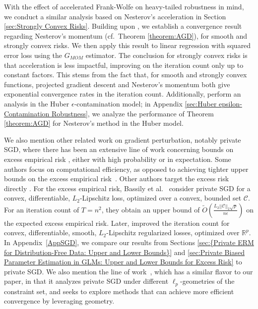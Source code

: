 \documentclass{article}
\begin{document}
With the effect of accelerated Frank-Wolfe on heavy-tailed robustness in mind, we conduct a similar analysis based on Nesterov's acceleration in Section \ref{sec:Strongly Convex Risks}. Building upon \cite{RE}, we establish a convergence result regarding Nesterov's momentum (cf.\ Theorem \ref{theorem:AGD}), for smooth and strongly convex risks. We then apply this result to linear regression with squared error loss using the $G_{MOM}$ estimator. The conclusion for strongly convex risks is that acceleration is less impactful, improving on the iteration count only up to constant factors. This stems from the fact that, for smooth and strongly convex functions, projected gradient descent and Nesterov's momentum both give exponential convergence rates in the iteration count. Additionally, \cite{RE} perform an analysis in the Huber $\epsilon$-contamination model; in Appendix \ref{sec:Huber epsilon-Contamination Robustness}, we analyze the performance of Theorem \ref{theorem:AGD} for Nesterov's method in the Huber model. 

We also mention other related work on gradient perturbation, notably private SGD, where there has been an extensive line of work concerning bounds on excess empirical risk \cite{SGD_DP_2013_Upd, Bassily_SGD_l2, Is_Inter_Nec_DP_ERM, DP_ERM_Faster, Priv_SGD_l1_Geom}, either with high probability or in expectation. Some authors focus on computational efficiency, as opposed to achieving tighter upper bounds on the excess empirical risk~\cite{Towards_Prac_DP_ERM, BOLT_ON_PRIV}. Other authors target the excess risk directly \cite{BasEtal19, SCO_Feldman_2020, BasEtal21}. For the excess empirical risk, Bassily et al.~\cite{Bassily_SGD_l2} consider private SGD for a convex, differentiable, $L_2$-Lipschitz loss, optimized over a convex, bounded set $\mathcal{C}$. For an iteration count of $T = n^2$, they obtain an upper bound of $\widetilde{O}\left(\frac{L_2||\mathcal{C}||_2\sqrt{p}}{n\epsilon}\right)$ on the expected excess empirical risk. Later, \cite{DP_ERM_Faster} improved the iteration count for convex, differentiable, smooth, $L_2$-Lipschitz regularized losses, optimized over $\mathbb{R}^p$. In Appendix~\ref{AppSGD}, we compare our results from Sections \ref{sec:{Private ERM for Distribution-Free Data: Upper and Lower Bounds}} and \ref{sec:Private Biased Parameter Estimation in GLMs: Upper and Lower Bounds for Excess Risk} to private SGD. We also mention the line of work~\cite{BasEtal19, BasEtal21}, which has a similar flavor to our paper, in that it analyzes private SGD under different $\ell_p$-geometries of the constraint set, and seeks to explore methods that can achieve more efficient convergence by leveraging geometry.
\end{document}
